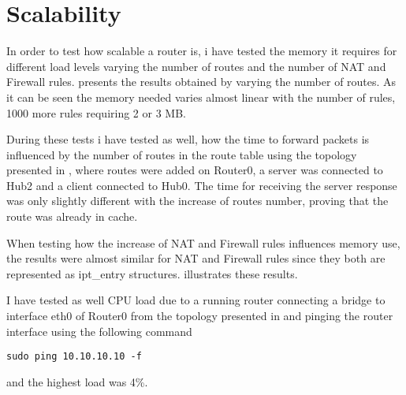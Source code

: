 \section{Scalability}
\label{sec:scalability}

In order to test how scalable a router is, i have tested the memory it requires for different load levels varying the number of routes and the number of NAT and Firewall rules.
 presents the results obtained by varying the number of routes.
As it can be seen the memory needed varies almost linear with the number of rules, 1000 more rules requiring 2 or 3 MB.

During these tests i have tested as well, how the time to forward packets is influenced by the number of routes in the route table using the topology presented in , where routes were added on Router0, a server was connected to Hub2 and a client connected to Hub0. The time for receiving the server response was only slightly different with the increase of routes number, proving that the route was already in cache.

When testing how the increase of NAT and Firewall rules influences memory use, the results were almost similar for NAT and Firewall rules since they both are represented as ipt_entry structures. illustrates these results.

I have tested as well CPU load due to a running router connecting a bridge to interface eth0 of Router0 from the topology presented in  and pinging the router interface using the following command
\lstset{language=TeX,caption=Commands for configuring the bridge,label=test-bridge-config}
\begin{lstlisting}
sudo ping 10.10.10.10 -f
\end{lstlisting}
and the highest load was 4\%.

